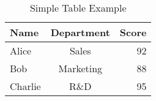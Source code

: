 \begin{table}[H]
    \centering
    \caption{Simple Table Example}
    \begin{tabular}{l c r}
    \toprule
    Name & Department & Score \\
    \midrule
    Alice & Sales & 92 \\
    Bob & Marketing & 88 \\
    Charlie & R\&D & 95 \\
    \bottomrule
    \end{tabular}
    \end{table}
    